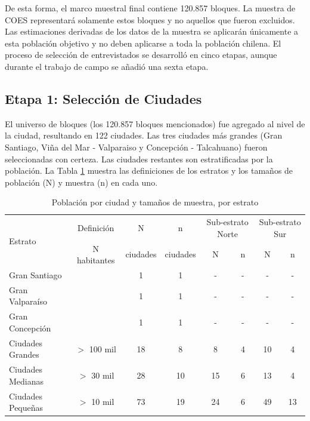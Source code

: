 \documentclass[12pt]{report}
\begin{document}
De esta forma, el marco muestral final contiene 120.857 bloques. La muestra de COES representará solamente estos bloques y no aquellos que fueron excluidos. Las estimaciones derivadas de los datos de la muestra se aplicarán únicamente a esta población objetivo y no deben aplicarse a toda la población chilena. El proceso de selección de entrevistados se desarrolló en cinco etapas, aunque durante el trabajo de campo se añadió una sexta etapa.\\

\subsection*{Etapa 1: Selección de Ciudades}

El universo de bloques (los 120.857 bloques mencionados) fue agregado al nivel de la ciudad, resultando en 122 ciudades. Las tres ciudades más grandes (Gran Santiago, Viña del Mar - Valparaiso y Concepción - Talcahuano) fueron seleccionadas con certeza. Las ciudades restantes son estratificadas por la población. La Tabla \ref{table:estratos} muestra las definiciones de los estratos y los tamaños de población (N) y muestra (n) en cada uno.\\

\begin{table}[H]
	\centering
	\caption{Población por ciudad y tamaños de muestra, por estrato}
	\label{table:estratos}
	\begin{tabular}{p{3.4cm}c c c c c c c}
		\toprule
		\multirow{2}{*}{Estrato}&Definición&N&n&\multicolumn{2}{c}{Sub-estrato Norte}&\multicolumn{2}{c}{Sub-estrato Sur}\\
		&N habitantes&ciudades&ciudades&N   &n&N   &n\\
				 \midrule
Gran Santiago     &  & 1 & 1 & - & - & - & -  \\
Gran Valparaíso   &  & 1 & 1 & - & - & - & -     \\
Gran Concepción   &  & 1 & 1 & - & - & - & -      \\
Ciudades Grandes  & $>$ 100 mil & 18 & 8 & 8 & 4 & 10 & 4    \\
Ciudades Medianas & $>$ 30 mil  & 28 & 10 & 15 & 6 & 13 & 4  \\
Ciudades Pequeñas & $>$ 10 mil  & 73 & 19 & 24 & 6 & 49 & 13  \\
		\bottomrule
	\end{tabular}
\end{table}
\end{document}
